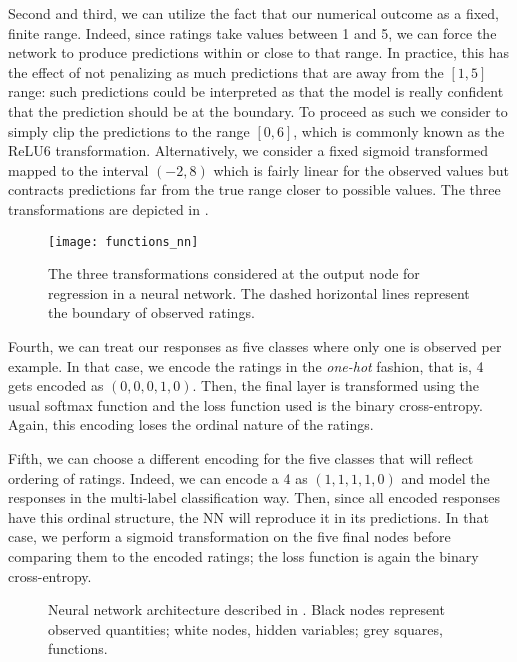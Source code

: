 \documentclass[bj, preprint]{imsart}
\begin{document}
Second and third, we can utilize the fact that our numerical outcome as a fixed, finite range. Indeed, since ratings take values between 1 and 5, we can force the network to produce predictions within or close to that range. In practice, this has the effect of not penalizing as much predictions that are away from the $[1,5]$ range: such predictions could be interpreted as that the model is really confident that the prediction should be at the boundary. To proceed as such we consider to simply clip the predictions to the range $[0,6]$, which is commonly known as the ReLU6 transformation. Alternatively, we consider a fixed sigmoid transformed mapped to the interval $(-2,8)$ which is fairly linear for the observed values but contracts predictions far from the true range closer to possible values. The three transformations are depicted in .

\begin{figure}[h]
\centering
\texttt{[image: functions\_nn]}
\caption{The three transformations considered at the output node for regression in a neural network. The dashed horizontal lines represent the boundary of observed ratings. }\label{fig:method.models.nn.functions}
\end{figure}

Fourth, we can treat our responses as five classes where only one is observed per example. In that case, we encode the ratings in the \textit{one-hot} fashion, that is, 4 gets encoded as $(0,0,0,1,0)$. Then, the final layer is transformed using the usual softmax function and the loss function used is the binary cross-entropy. Again, this encoding loses the ordinal nature of the ratings.

Fifth, we can choose a different encoding for the five classes that will reflect ordering of ratings. Indeed, we can encode a 4 as $(1,1,1,1,0)$ and model the responses in the multi-label classification way. Then, since all encoded responses have this ordinal structure, the NN will reproduce it in its predictions. In that case, we perform a sigmoid transformation on the five final nodes before comparing them to the encoded ratings; the loss function is again the binary cross-entropy.



\begin{figure}
\centering

\caption{Neural network architecture described in . Black nodes represent observed quantities; white nodes, hidden variables; grey squares, functions.}
\label{fig:method.models.nn}
\end{figure}
\end{document}
